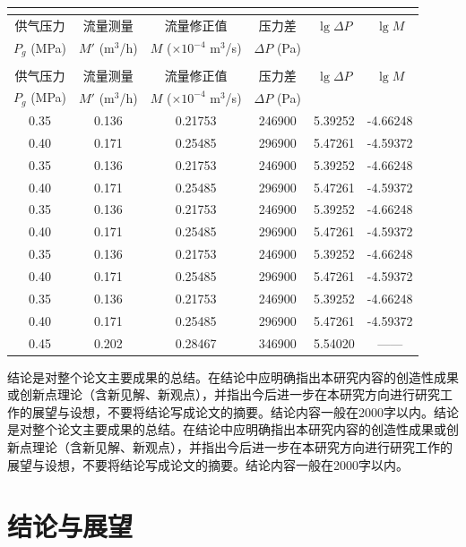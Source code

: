 \documentclass[a4paper, twoside, openany]{NCEPUMaster_Original}
\begin{document}
\begin{longtable}{C{0.15} C{0.15} C{0.25} C{0.15} C{0.15} C{0.15}}
\label{tab:permeability} \\ %

\toprule[1.5pt]
供气压力 & 流量测量 & 流量修正值 & 压力差 & $\lg \Delta P$ & $\lg M$ \\ 
$P_g$ (MPa) & $M'$ (m$^3$/h) & $M$ ($\times10^{-4}$ m$^3$/s) & $\Delta P$ (Pa) & & \\  %
\midrule[1pt]
\endfirsthead

 \\ %
\toprule[1.5pt]
供气压力 & 流量测量 & 流量修正值 & 压力差 & $\lg \Delta P$ & $\lg M$ \\ 
$P_g$ (MPa) & $M'$ (m$^3$/h) & $M$ ($\times10^{-4}$ m$^3$/s) & $\Delta P$ (Pa) & & \\ %
\midrule[1pt]
\endhead

\bottomrule[1.5pt]
\endfoot

0.35 & 0.136 & 0.21753 & 246900 & 5.39252 & -4.66248 \\  
0.40 & 0.171 & 0.25485 & 296900 & 5.47261 & -4.59372 \\
0.35 & 0.136 & 0.21753 & 246900 & 5.39252 & -4.66248 \\
0.40 & 0.171 & 0.25485 & 296900 & 5.47261 & -4.59372 \\
0.35 & 0.136 & 0.21753 & 246900 & 5.39252 & -4.66248 \\
0.40 & 0.171 & 0.25485 & 296900 & 5.47261 & -4.59372 \\
0.35 & 0.136 & 0.21753 & 246900 & 5.39252 & -4.66248 \\
0.40 & 0.171 & 0.25485 & 296900 & 5.47261 & -4.59372 \\
0.35 & 0.136 & 0.21753 & 246900 & 5.39252 & -4.66248 \\
0.40 & 0.171 & 0.25485 & 296900 & 5.47261 & -4.59372 \\
0.45 & 0.202 & 0.28467 & 346900 & 5.54020 & —— 
\end{longtable}

结论是对整个论文主要成果的总结。在结论中应明确指出本研究内容的创造性成果或创新点理论（含新见解、新观点），并指出今后进一步在本研究方向进行研究工作的展望与设想，不要将结论写成论文的摘要。结论内容一般在2000字以内。结论是对整个论文主要成果的总结。在结论中应明确指出本研究内容的创造性成果或创新点理论（含新见解、新观点），并指出今后进一步在本研究方向进行研究工作的展望与设想，不要将结论写成论文的摘要。结论内容一般在2000字以内。\chapter{结论与展望}
\end{document}
